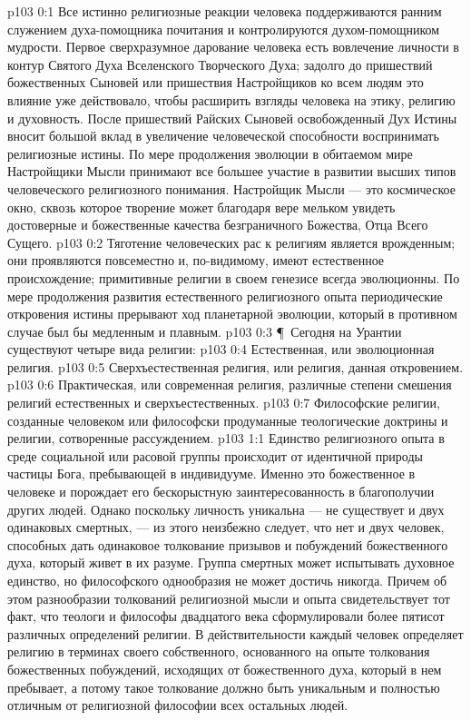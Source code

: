 \vs p103 0:1 Все истинно религиозные реакции человека поддерживаются ранним служением духа\hyp{}помощника почитания и контролируются духом\hyp{}помощником мудрости. Первое сверхразумное дарование человека есть вовлечение личности в контур Святого Духа Вселенского Творческого Духа; задолго до пришествий божественных Сыновей или пришествия Настройщиков ко всем людям это влияние уже действовало, чтобы расширить взгляды человека на этику, религию и духовность. После пришествий Райских Сыновей освобожденный Дух Истины вносит большой вклад в увеличение человеческой способности воспринимать религиозные истины. По мере продолжения эволюции в обитаемом мире Настройщики Мысли принимают все большее участие в развитии высших типов человеческого религиозного понимания. Настройщик Мысли --- это космическое окно, сквозь которое творение может благодаря вере мельком увидеть достоверные и божественные качества безграничного Божества, Отца Всего Сущего.
\vs p103 0:2 Тяготение человеческих рас к религиям является врожденным; они проявляются повсеместно и, по\hyp{}видимому, имеют естественное происхождение; примитивные религии в своем генезисе всегда эволюционны. По мере продолжения развития естественного религиозного опыта периодические откровения истины прерывают ход планетарной эволюции, который в противном случае был бы медленным и плавным.
\vs p103 0:3 \P\ Сегодня на Урантии существуют четыре вида религии:
\vs p103 0:4 \bibnobreakspace Естественная, или эволюционная религия.
\vs p103 0:5 \bibnobreakspace Сверхъестественная религия, или религия, данная откровением.
\vs p103 0:6 \bibnobreakspace Практическая, или современная религия, различные степени смешения религий естественных и сверхъестественных.
\vs p103 0:7 \bibnobreakspace Философские религии, созданные человеком или философски продуманные теологические доктрины и религии, сотворенные рассуждением.
\vs p103 1:1 Единство религиозного опыта в среде социальной или расовой группы происходит от идентичной природы частицы Бога, пребывающей в индивидууме. Именно это божественное в человеке и порождает его бескорыстную заинтересованность в благополучии других людей. Однако поскольку личность уникальна --- не существует и двух одинаковых смертных, --- из этого неизбежно следует, что нет и двух человек, способных дать одинаковое толкование призывов и побуждений божественного духа, который живет в их разуме. Группа смертных может испытывать духовное единство, но философского однообразия не может достичь никогда. Причем об этом разнообразии толкований религиозной мысли и опыта свидетельствует тот факт, что теологи и философы двадцатого века сформулировали более пятисот различных определений религии. В действительности каждый человек определяет религию в терминах своего собственного, основанного на опыте толкования божественных побуждений, исходящих от божественного духа, который в нем пребывает, а потому такое толкование должно быть уникальным и полностью отличным от религиозной философии всех остальных людей.
